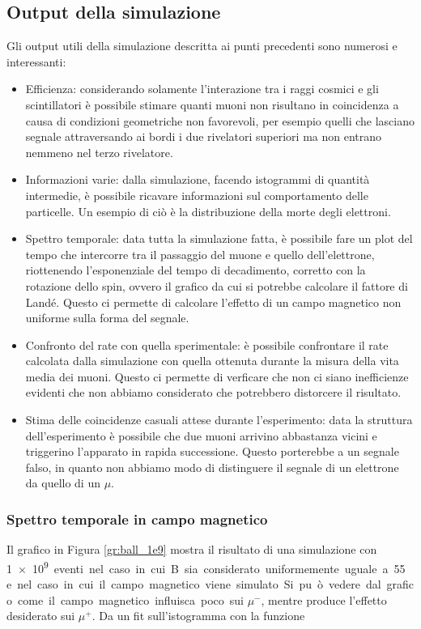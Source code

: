 \subsection{Output della simulazione}
Gli output utili della simulazione descritta ai punti precedenti sono numerosi e interessanti:
\begin{itemize}
\item Efficienza: considerando solamente l'interazione tra i raggi cosmici e gli scintillatori è possibile stimare quanti muoni non risultano in coincidenza a causa
di condizioni geometriche non favorevoli, per esempio quelli che lasciano segnale attraversando ai bordi i due rivelatori superiori ma non entrano nemmeno nel terzo
rivelatore.
\item Informazioni varie: dalla simulazione, facendo istogrammi di quantit\`a intermedie, \`e possibile ricavare informazioni sul comportamento delle particelle. Un esempio di ci\`o \`e la distribuzione della morte degli elettroni.
\item Spettro temporale: data tutta la simulazione fatta, è possibile fare un plot del tempo che intercorre tra il passaggio del muone e quello dell'elettrone, riottenendo
l'esponenziale del tempo di decadimento, corretto con la rotazione dello spin, ovvero il grafico da cui si potrebbe calcolare il fattore di Land\'e. Questo ci permette di calcolare l'effetto di un campo magnetico non uniforme sulla forma del segnale.
\item Confronto del rate con quella sperimentale: \`e possibile confrontare il rate calcolata dalla simulazione con quella ottenuta durante la misura della vita media dei muoni. Questo ci permette di verficare che non ci siano inefficienze evidenti che non abbiamo considerato che potrebbero distorcere il risultato.
\item Stima delle coincidenze casuali attese durante l'esperimento: data la struttura dell'esperimento \`e possibile che due muoni arrivino abbastanza vicini e triggerino l'apparato in rapida successione. Questo porterebbe a un segnale falso, in quanto non abbiamo modo di distinguere il segnale di un elettrone da quello di un $\mu$.
\end{itemize}

\subsubsection{Spettro temporale in campo magnetico}
Il grafico in Figura \ref{gr:ball_1e9} mostra il risultato di una simulazione con \SI{1e9} eventi nel caso in cui B sia considerato uniformemente uguale a \SI{55}{\gauss} e nel caso in cui il campo magnetico viene simulato. 
Si pu\`o vedere dal grafico come il campo magnetico influisca poco sui $\mu^-$, mentre produce l'effetto desiderato sui $\mu^+$. 
Da un fit sull'istogramma con la funzione

